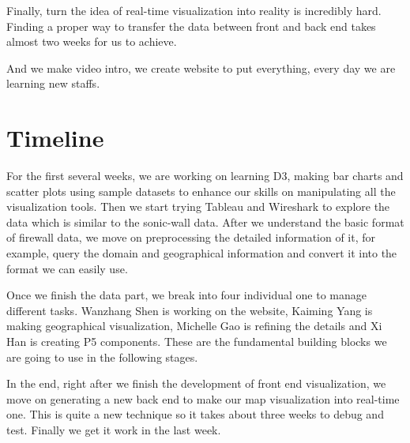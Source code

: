 Finally, turn the idea of real-time visualization into reality is incredibly hard. Finding a proper way to transfer the data between front and back end takes almost two weeks for us to achieve.

And we make video intro, we create website to put everything, every day we are learning new staffs.

\section{Timeline}
For the first several weeks, we are working on learning D3, making bar charts and scatter plots using sample datasets to enhance our skills on manipulating all the visualization tools. Then we start trying Tableau and Wireshark to explore the data which is similar to the sonic-wall data. After we understand the basic format of firewall data, we move on preprocessing the detailed information of it, for example, query the domain and geographical information and convert it into the format we can easily use.

Once we finish the data part, we break into four individual one to manage different tasks. Wanzhang Shen is working on the website, Kaiming Yang is making geographical visualization, Michelle Gao is refining the details and Xi Han is creating P5 components. These are the fundamental building blocks we are going to use in the following stages.

In the end, right after we finish the development of front end visualization, we move on generating a new back end to make our map visualization into real-time one. This is quite a new technique so it takes about three weeks to debug and test. Finally we get it work in the last week.

